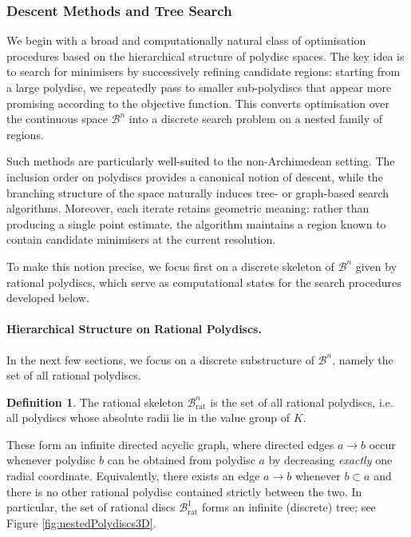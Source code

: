 \documentclass[10pt]{article}
\theoremstyle{definition}
\newtheorem{definition}[theorem]{Definition}
\begin{document}
\subsubsection{Descent Methods and Tree Search}

We begin with a broad and computationally natural class of optimisation procedures based on the hierarchical structure of polydisc spaces. The key idea is to search for minimisers by successively refining candidate regions: starting from a large polydisc, we repeatedly pass to smaller sub-polydiscs that appear more promising according to the objective function. This converts optimisation over the continuous space $\mathcal{B}^n$ into a discrete search problem on a nested family of regions.

Such methods are particularly well-suited to the non-Archimedean setting. The inclusion order on polydiscs provides a canonical notion of descent, while the branching structure of the space naturally induces tree- or graph-based search algorithms. Moreover, each iterate retains geometric meaning: rather than producing a single point estimate, the algorithm maintains a region known to contain candidate minimisers at the current resolution.

To make this notion precise, we focus first on a discrete skeleton of \(\mathcal B^n\) given by rational polydiscs, which serve as computational states for the search procedures developed below.

\paragraph{Hierarchical Structure on Rational Polydiscs.} In the next few sections, we focus on a discrete substructure of $\mathcal{B}^n$, namely the set of all rational polydiscs.

\begin{definition}
    The rational skeleton $\mathcal{B}^n_\text{rat}$ is the set of all rational polydiscs, i.e. all polydiscs whose absolute radii lie in the value group of $K$.
\end{definition}

These form an infinite directed acyclic graph, where directed edges $a \rightarrow b$ occur whenever polydisc $b$ can be obtained from polydisc $a$ by decreasing \emph{exactly} one radial coordinate. 
Equivalently, there exists an edge $a \to b$ whenever $b \subset a$ and there is no other rational polydisc contained strictly between the two. 
In particular, the set of rational discs $\mathcal{B}^1_\text{rat}$ forms an infinite (discrete) tree; see Figure \ref{fig:nestedPolydiscs3D}.
\end{document}
